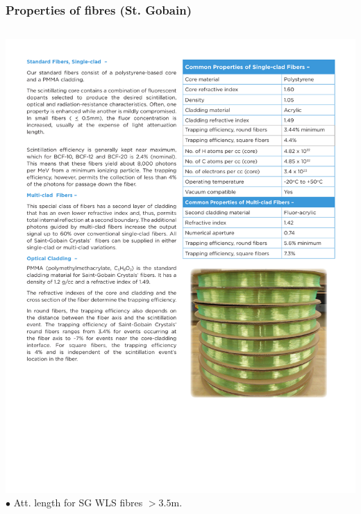 \begin{frame}
\frametitle{Properties of fibres (St. Gobain)}
\begin{columns}
\includegraphics[scale=0.5]{img/fibersStGobain.pdf}
$\bullet$ Att. length for SG WLS fibres $>3.5$m.
  

\end{columns}
\end{frame}
